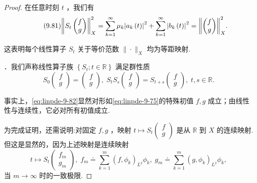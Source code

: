 \begin{proof}
在任意时刻 $t$ ，我们有
\begin{equation}\tag{9.81}\label{eq:linpde-9-81}
{\norm{{S}_{t}\begin{pmatrix}f \\ g\end{pmatrix}}}_{X}^{2} = \sum_{{k = 1}}^{\infty }{\mu }_{k}{\left| {a}_{k}\left( t\right) \right| }^{2} + \sum_{{k = 1}}^{\infty }{\left| {b}_{k}\left( t\right) \right| }^{2} = {\norm{\begin{pmatrix}f \\ g\end{pmatrix}}}_{X}^{2}.
\end{equation}

这表明每个线性算子 ${S}_{t}$ 关于等价范数 $\|  \cdot  {\| }_{X}$ 均为等距映射.

．我们声称线性算子族 $\left\{  {{S}_{t};t \in  \mathbb{R}}\right\}$ 满足群性质
\begin{equation}\tag{9.82}\label{eq:linpde-9-82}
{S}_{0}\begin{pmatrix}f \\ g\end{pmatrix}  = \begin{pmatrix}f \\ g\end{pmatrix} ,\;{S}_{t}{S}_{s}\begin{pmatrix}f \\ g\end{pmatrix}  = {S}_{t + s}\begin{pmatrix}f \\ g\end{pmatrix} ,\;t,s \in  \mathbb{R}.
\end{equation}

事实上，\eqref{eq:linpde-9-82}显然对形如\eqref{eq:linpde-9-75}的特殊初值 $f,g$ 成立；由线性性与连续性，它必对所有初值成立.

为完成证明，还需说明:对固定 $f,g$ ，映射 $t \mapsto  {S}_{t}\begin{pmatrix}f \\ g\end{pmatrix}$ 是从 $\mathbb{R}$ 到 $X$ 的连续映射.但这是显然的，因为上述映射是连续映射
\begin{equation}\tag{9.83}\label{eq:linpde-9-83}
t \mapsto  {S}_{t}\left( \begin{matrix} {f}_{m} \\  {g}_{m} \end{matrix}\right) ,\;{f}_{m} \doteq  \sum_{{k = 1}}^{m}{\left( f,{\phi }_{k}\right) }_{{L}^{2}}{\phi }_{k},\;{g}_{m} \doteq  \sum_{{k = 1}}^{m}{\left( g,{\phi }_{k}\right) }_{{L}^{2}}{\phi }_{k},
\end{equation}
当 $m \rightarrow  \infty$ 时的一致极限.


\end{proof}
